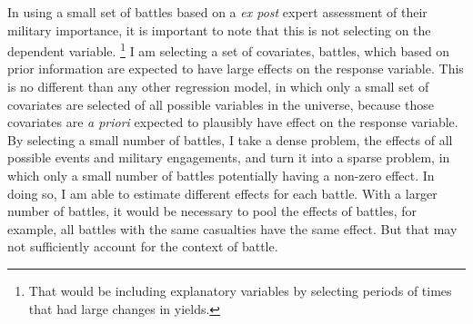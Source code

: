 In using a small set of battles based on a \textit{ex post} expert assessment of their military importance, it is important to note that this is not selecting on the dependent variable.%
\footnote{
  That would be including explanatory variables by selecting periods of times that had large changes in yields.
}
I am selecting a set of covariates, battles, which based on prior information are expected to have large effects on the response variable.
This is no different than any other regression model, in which only a small set of covariates are selected of all possible variables in the universe, because those covariates are \textit{a priori} expected to plausibly have effect on the response variable.
By selecting a small number of battles, I take a dense problem, the effects of all possible events and military engagements, and turn it into a sparse problem, in which only a small number of battles potentially having a non-zero effect.
In doing so, I am able to estimate different effects for each battle.
With a larger number of battles, it would be necessary to pool the effects of battles, for example, all battles with the same casualties have the same effect.
But that may not sufficiently account for the context of battle.

